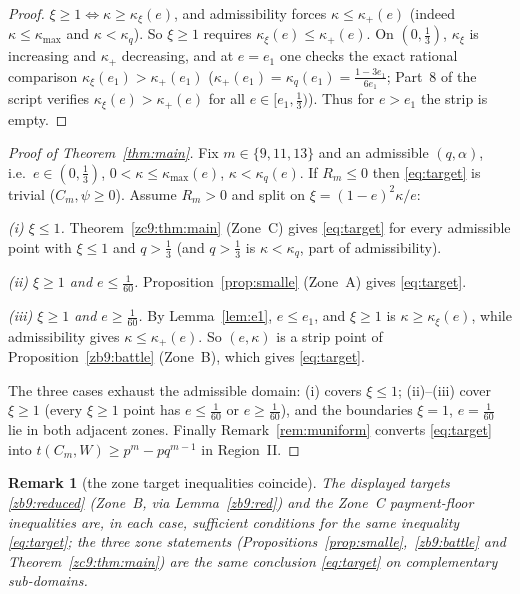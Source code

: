 \documentclass[11pt]{amsart}
\newtheorem{remark}[theorem]{Remark}
\newcommand{\kxi}{\kappa_\xi}
\newcommand{\kq}{\kappa_q}
\newcommand{\kmx}{\kappa_{\max}}
\newcommand{\khi}{\kappa_{+}}
\begin{document}
\begin{proof}
$\xi\ge1\iff\kappa\ge\kxi(e)$, and admissibility forces $\kappa\le\khi(e)$
(indeed $\kappa\le\kmx$ and $\kappa<\kq$).  So $\xi\ge1$ requires
$\kxi(e)\le\khi(e)$.  On $(0,\tfrac13)$, $\kxi$ is increasing and $\khi$
decreasing, and at $e=e_1$ one checks the exact rational comparison
$\kxi(e_1)>\khi(e_1)$ ($\khi(e_1)=\kq(e_1)=\tfrac{1-3e_1}{6e_1}$; Part~8 of the
script verifies $\kxi(e)>\khi(e)$ for all $e\in[e_1,\tfrac13)$).  Thus for
$e>e_1$ the strip is empty.
\end{proof}

\begin{proof}[Proof of Theorem~\ref{thm:main}]
Fix $m\in\{9,11,13\}$ and an admissible $(q,\alpha)$, i.e.\ $e\in(0,\tfrac13)$,
$0<\kappa\le\kmx(e)$, $\kappa<\kq(e)$.  If $R_m\le0$ then \eqref{eq:target} is
trivial ($C_m,\psi\ge0$).  Assume $R_m>0$ and split on $\xi=(1-e)^2\kappa/e$:

\smallskip\noindent\emph{(i) $\xi\le1$.}  Theorem~\ref{zc9:thm:main} (Zone~C)
gives \eqref{eq:target} for every admissible point with $\xi\le1$ and
$q>\tfrac13$ (and $q>\tfrac13$ is $\kappa<\kq$, part of admissibility).

\smallskip\noindent\emph{(ii) $\xi\ge1$ and $e\le\tfrac1{60}$.}
Proposition~\ref{prop:smalle} (Zone~A) gives \eqref{eq:target}.

\smallskip\noindent\emph{(iii) $\xi\ge1$ and $e\ge\tfrac1{60}$.}  By
Lemma~\ref{lem:e1}, $e\le e_1$, and $\xi\ge1$ is $\kappa\ge\kxi(e)$, while
admissibility gives $\kappa\le\khi(e)$.  So $(e,\kappa)$ is a strip point of
Proposition~\ref{zb9:battle} (Zone~B), which gives \eqref{eq:target}.

\smallskip The three cases exhaust the admissible domain: (i) covers $\xi\le1$;
(ii)--(iii) cover $\xi\ge1$ (every $\xi\ge1$ point has $e\le\tfrac1{60}$ or
$e\ge\tfrac1{60}$), and the boundaries $\xi=1$, $e=\tfrac1{60}$ lie in both
adjacent zones.  Finally Remark~\ref{rem:muniform} converts \eqref{eq:target}
into $t(C_m,W)\ge p^m-pq^{m-1}$ in Region~II.
\end{proof}

\begin{remark}[the zone target inequalities coincide]\label{rem:coincide}
The displayed targets \eqref{zb9:reduced} (Zone~B, via Lemma~\ref{zb9:red}) and
the Zone~C payment-floor inequalities are, in each case, sufficient conditions
for the \emph{same} inequality \eqref{eq:target}; the three zone statements
(Propositions~\ref{prop:smalle},~\ref{zb9:battle} and
Theorem~\ref{zc9:thm:main}) are the same conclusion \eqref{eq:target} on
complementary sub-domains.
\end{remark}
\end{document}
